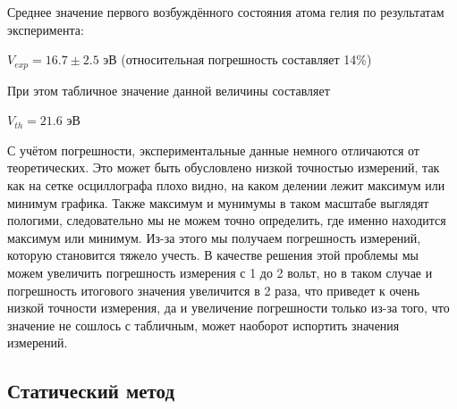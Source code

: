 \documentclass[a4paper, 12pt]{article}%
\begin{document}
\begin{enumerate}
Среднее значение первого возбуждённого состояния атома гелия по результатам эксперимента:
\begin{center}
    $V_{exp} = 16.7 \pm 2.5$ эВ (относительная погрешность составляет 14\%)
\end{center}
При этом табличное значение данной величины составляет
\begin{center}
    $V_{th} = 21.6$ эВ
\end{center}
С учётом погрешности, экспериментальные данные немного отличаются от теоретических. Это может быть обусловлено низкой точностью измерений, так как на сетке осциллографа плохо видно, на каком делении лежит максимум или минимум графика. Также максимум и мунимумы в таком масштабе выглядят пологими, следовательно мы не можем точно определить, где именно  находится максимум или минимум. Из-за этого мы получаем погрешность измерений, которую становится тяжело учесть. В качестве решения этой проблемы мы можем увеличить погрешность измерения с 1 до 2 вольт, но в таком случае и погрешность итогового значения увеличится в 2 раза, что приведет к очень низкой точности измерения, да и увеличение погрешности только из-за того, что значение не сошлось с табличным, может наоборот испортить значения измерений.

\end{enumerate}

\subsection{Статический метод}
\end{document}
